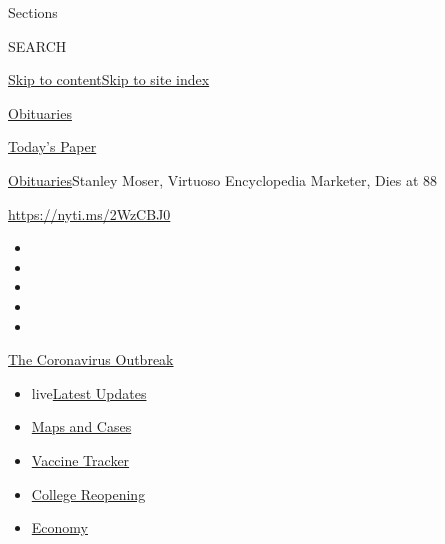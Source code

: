 Sections

SEARCH

\protect\hyperlink{site-content}{Skip to
content}\protect\hyperlink{site-index}{Skip to site index}

\href{https://www.nytimes.com/section/obituaries}{Obituaries}

\href{https://myaccount.nytimes.com/auth/login?response_type=cookie\&client_id=vi}{}

\href{https://www.nytimes.com/section/todayspaper}{Today's Paper}

\href{/section/obituaries}{Obituaries}\textbar{}Stanley Moser, Virtuoso
Encyclopedia Marketer, Dies at 88

\url{https://nyti.ms/2WzCBJ0}

\begin{itemize}
\item
\item
\item
\item
\item
\end{itemize}

\href{https://www.nytimes.com/news-event/coronavirus?action=click\&pgtype=Article\&state=default\&region=TOP_BANNER\&context=storylines_menu}{The
Coronavirus Outbreak}

\begin{itemize}
\tightlist
\item
  live\href{https://www.nytimes.com/2020/08/03/world/coronavirus-covid-19.html?action=click\&pgtype=Article\&state=default\&region=TOP_BANNER\&context=storylines_menu}{Latest
  Updates}
\item
  \href{https://www.nytimes.com/interactive/2020/us/coronavirus-us-cases.html?action=click\&pgtype=Article\&state=default\&region=TOP_BANNER\&context=storylines_menu}{Maps
  and Cases}
\item
  \href{https://www.nytimes.com/interactive/2020/science/coronavirus-vaccine-tracker.html?action=click\&pgtype=Article\&state=default\&region=TOP_BANNER\&context=storylines_menu}{Vaccine
  Tracker}
\item
  \href{https://www.nytimes.com/2020/08/02/us/covid-college-reopening.html?action=click\&pgtype=Article\&state=default\&region=TOP_BANNER\&context=storylines_menu}{College
  Reopening}
\item
  \href{https://www.nytimes.com/live/2020/08/03/business/stock-market-today-coronavirus?action=click\&pgtype=Article\&state=default\&region=TOP_BANNER\&context=storylines_menu}{Economy}
\end{itemize}

